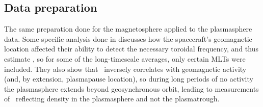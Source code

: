\subsection{Data preparation}
The same preparation done for the magnetosphere applied to the plasmasphere data.  Some specific analysis done in \cite{Takahashi2010SolarCycleVariation} discusses how the spacecraft's geomagnetic location affected their ability to detect the necessary toroidal frequency, and thus estimate \req, so for some of the long-timescale averages, only certain MLTs were included. They also show that \req\ inversely correlates with geomagnetic activity (and, by extension, plasmapause location), so during long periods of no activity the plasmasphere extends beyond geosynchronous orbit, leading to measurements of \req\ reflecting density in the plasmasphere and not the plasmatrough. 

